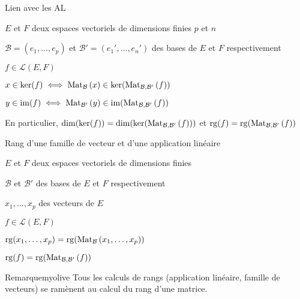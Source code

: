     \begin{prop}{Lien avec les AL}{}
        \begin{soient}
            \item $E$ et $F$ deux espaces vectoriels de dimensions finies $p$ et $n$
            \item $\mathcal{B} = (e_1, \ldots, e_p)$ et $\mathcal{B}' = (e_1', \ldots, e_n')$ des bases de $E$ et $F$ respectivement
            \item $f \in \mathcal{L}(E,F)$
        \end{soient}
        \begin{alors}
            \item $x \in \ker(f) \iff \text{Mat}_{\mathcal{B}}\left(x\right) \in \ker(\text{Mat}_{\mathcal{B},\mathcal{B}'}\left(f\right))$
            \item $y \in \operatorname{im}(f) \iff \text{Mat}_{\mathcal{B}'}\left(y\right) \in \operatorname{im}(\text{Mat}_{\mathcal{B},\mathcal{B}'}\left(f\right))$
        \end{alors}
        En particulier, $\dim(\ker(f)) = \dim(\ker(\text{Mat}_{\mathcal{B},\mathcal{B}'}\left(f\right)))$ et $\operatorname{rg}(f) = \operatorname{rg}(\text{Mat}_{\mathcal{B},\mathcal{B}'}\left(f\right))$
    \end{prop}

    \begin{prop}{Rang d’une famille de vecteur et d’une application linéaire}{}
        \begin{soit}
            \item $E$ et $F$ deux espaces vectoriels de dimensions finies
            \item $\mathcal{B}$ et $\mathcal{B}'$ des bases de $E$ et $F$ respectivement
            \item $x_1,\ldots,x_p$ des vecteurs de $E$
            \item $f \in \mathcal{L}(E,F)$
        \end{soit}
        \begin{alors}
            \item $\operatorname{rg}(x_1,\ldots,x_p) = \operatorname{rg}(\text{Mat}_{\mathcal{B}}\left(x_1,\ldots,x_p\right))$
            \item $\operatorname{rg}(f) = \operatorname{rg}(\text{Mat}_{\mathcal{B},\mathcal{B}'}\left(f\right))$
        \end{alors}
    \end{prop}

    \begin{omed}{Remarque}{myolive}
        Tous les calculs de rangs (application linéaire, famille de vecteurs) se ramènent au calcul du rang d’une matrice.
    \end{omed}

